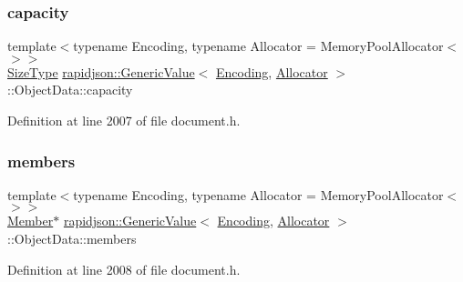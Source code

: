 \subsubsection{\texorpdfstring{capacity}{capacity}}
{\footnotesize\ttfamily template$<$typename Encoding, typename Allocator = Memory\+Pool\+Allocator$<$$>$$>$ \\
\mbox{\hyperlink{namespacerapidjson_a44eb33eaa523e36d466b1ced64b85c84}{Size\+Type}} \mbox{\hyperlink{classrapidjson_1_1_generic_value}{rapidjson\+::\+Generic\+Value}}$<$ \mbox{\hyperlink{classrapidjson_1_1_encoding}{Encoding}}, \mbox{\hyperlink{classrapidjson_1_1_allocator}{Allocator}} $>$\+::Object\+Data\+::capacity}



Definition at line 2007 of file document.\+h.

\mbox{\label{structrapidjson_1_1_generic_value_1_1_object_data_a9b9052818979866b380571d59c8178af}} 
\subsubsection{\texorpdfstring{members}{members}}
{\footnotesize\ttfamily template$<$typename Encoding, typename Allocator = Memory\+Pool\+Allocator$<$$>$$>$ \\
\mbox{\hyperlink{classrapidjson_1_1_generic_value_a0220ddebe2f023fa75b643a50e90e559}{Member}}$\ast$ \mbox{\hyperlink{classrapidjson_1_1_generic_value}{rapidjson\+::\+Generic\+Value}}$<$ \mbox{\hyperlink{classrapidjson_1_1_encoding}{Encoding}}, \mbox{\hyperlink{classrapidjson_1_1_allocator}{Allocator}} $>$\+::Object\+Data\+::members}



Definition at line 2008 of file document.\+h.

\mbox{\label{structrapidjson_1_1_generic_value_1_1_object_data_ae01f535401624121d8180b5615f17c1d}} 
